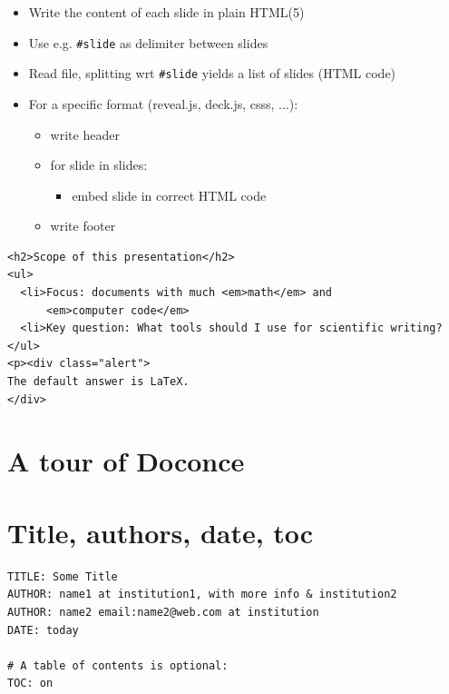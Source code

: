 \documentclass[%
twoside,                 %
final,                   %
chapterprefix=true,      %
open=right               %
10pt]{book}
\begin{document}
\begin{itemize}
 \item Write the content of each slide in plain HTML(5)

 \item Use e.g. \Verb!#slide! as delimiter between slides

 \item Read file, splitting wrt \Verb!#slide! yields a list of
   slides (HTML code)

 \item For a specific format (reveal.js, deck.js, csss, ...):
\begin{itemize}

    \item write header

    \item for slide in slides:
\begin{itemize}

      \item embed slide in correct HTML code

\end{itemize}

\noindent
    \item write footer
\end{itemize}

\noindent
\end{itemize}

\noindent
\begin{verbatim}
<h2>Scope of this presentation</h2>
<ul>
  <li>Focus: documents with much <em>math</em> and
      <em>computer code</em>
  <li>Key question: What tools should I use for scientific writing?
</ul>
<p><div class="alert">
The default answer is LaTeX.
</div>
\end{verbatim}


\section*{A tour of Doconce}

\section*{Title, authors, date, toc}

\begin{Verbatim}[numbers=none,fontsize=\fontsize{9pt}{9pt},baselinestretch=0.95]
TITLE: Some Title
AUTHOR: name1 at institution1, with more info & institution2
AUTHOR: name2 email:name2@web.com at institution
DATE: today

# A table of contents is optional:
TOC: on
\end{Verbatim}
\end{document}
